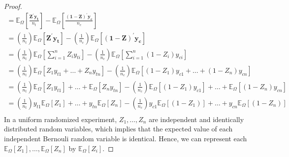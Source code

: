\documentclass[12pt,leqno]{article}
\theoremstyle{newstyle}
\begin{document}
\begin{proof}
\begin{align*}
= \mathbb{E}_{\Omega} \left[\frac{\mathbf{Z}^{\prime} \mathbf{y_t}}{n_t}\right] - \mathbb{E}_{\Omega}\left[\frac{(\mathbf{1} - \mathbf{Z})^{\prime} \mathbf{y_c}}{n_c}\right] \\
= \left(\frac{1}{n_t} \right) \mathbb{E}_{\Omega} \left[\mathbf{Z}^{\prime} \mathbf{y_t}\right] - \left(\frac{1}{n_c}\right) \mathbb{E}_{\Omega}\left[(\mathbf{1} - \mathbf{Z})^{\prime} \mathbf{y_c}\right] \\
= \left(\frac{1}{n_t} \right) \mathbb{E}_{\Omega} \left[ \sum \limits_{i = 1}^n Z_i y_{ti}\right] - \left(\frac{1}{n_c}\right) \mathbb{E}_{\Omega}\left[\sum \limits_{i = 1}^n \left(1 - Z_i\right) y_{ci} \right] \\
= \left(\frac{1}{n_t} \right) \mathbb{E}_{\Omega} \left[ Z_1 y_{t1} + \dots + Z_n y_{tn}\right] - \left(\frac{1}{n_c}\right) \mathbb{E}_{\Omega}\left[\left(1 - Z_1\right) y_{c1} + \dots + \left(1 - Z_n\right) y_{cn} \right] \\
= \left(\frac{1}{n_t} \right) \mathbb{E}_{\Omega} \left[ Z_1 y_{t1}\right] + \dots + \mathbb{E}_{\Omega} \left[Z_n y_{tn}\right] - \left(\frac{1}{n_c}\right) \mathbb{E}_{\Omega}\left[\left(1 - Z_1\right) y_{c1}\right] + \dots + \mathbb{E}_{\Omega} \left[\left(1 - Z_n\right) y_{cn} \right] \\
= \left(\frac{1}{n_t} \right) y_{t1}\mathbb{E}_{\Omega} \left[ Z_1 \right] + \dots + y_{tn}\mathbb{E}_{\Omega} \left[Z_n\right] - \left(\frac{1}{n_c}\right) y_{c1}\mathbb{E}_{\Omega}\left[\left(1 - Z_1\right) \right] + \dots + y_{cn}\mathbb{E}_{\Omega} \left[\left(1 - Z_n\right) \right] \\
\end{align*}
In a uniform randomized experiment, $Z_1, \dots , Z_n$ are independent and identically distributed random variables, which implies that the expected value of each independent Bernouli random variable is identical. Hence, we can represent each $\mathbb{E}_{\Omega} \left[ Z_1 \right], \dots , \mathbb{E}_{\Omega} \left[ Z_n \right]$ by $\mathbb{E}_{\Omega} \left[ Z_i \right]$.


\end{proof}
\end{document}

